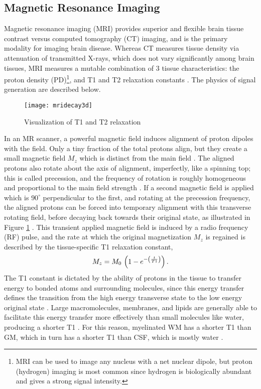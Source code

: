 \subsection{Magnetic Resonance Imaging}\label{ss:mri}
Magnetic resonance imaging (MRI) provides superior and flexible brain tissue contrast versus computed tomography (CT) imaging, and is the primary modality for imaging brain disease. Whereas CT measures tissue density via attenuation of transmitted X-rays, which does not vary significantly among brain tissues, MRI measures a mutable combination of 3 tissue characteristics: the proton density (PD)\footnote{MRI can be used to image any nucleus with a net nuclear dipole, but proton (hydrogen) imaging is most common since hydrogen is biologically abundant and gives a strong signal intensity.}, and T1 and T2 relaxation constants \cite{Pooley2005}. The physics of signal generation are described below.
\par
\begin{figure}[b]
  \centering\texttt{[image: mridecay3d]}
  \caption{Visualization of T1 and T2 relaxation}
  \label{fig:mridecay3d}
\end{figure}
In an MR scanner, a powerful magnetic field induces alignment of proton dipoles with the field. Only a tiny fraction of the total protons align, but they create a small magnetic field $M_z$ which is distinct from the main field \cite{Bloch1946}. The aligned protons also rotate about the axis of alignment, imperfectly, like a spinning top; this is called precession, and the frequency of rotation is roughly homogeneous and proportional to the main field strength \cite{Bloch1946}. If a second magnetic field is applied which is $90^{\circ}$ perpendicular to the first, and rotating at the precession frequency, the aligned protons can be forced into temporary alignment with this transverse rotating field, before decaying back towards their original state, as illustrated in Figure \ref{fig:mridecay3d} \cite{Bloch1946}. This transient applied magnetic field is induced by a radio frequency (RF) pulse, and the rate at which the original magnetization $M_z$ is regained is described by the tissue-specific T1 relaxation constant,
\begin{equation}
M_z = M_0\thinspace\left(1-e^{-\left(\frac{t}{T1}\right)}\right)\label{eq:T1}.
\end{equation}
The T1 constant is dictated by the ability of protons in the tissue to transfer energy to bonded atoms and surrounding molecules, since this energy transfer defines the transition from the high energy transverse state to the low energy original state \cite{Bloch1946,Bryant2005}. Large macromolecules, membranes, and lipids are generally able to facilitate this energy transfer more effectively than small molecules like water, producing a shorter T1 \cite{Koenig1990}. For this reason, myelinated WM has a shorter T1 than GM, which in turn has a shorter T1 than CSF, which is mostly water \cite{Roberts2007}.
